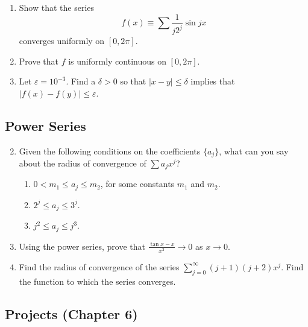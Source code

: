 \documentclass{article}
\begin{document}
\begin{enumerate}
\begin{enumerate}
                  \item Show that the series
                        \[
                              f(x)\equiv \sum \frac{1}{j2^j}\sin jx
                        \]
                        converges uniformly on $[0,2\pi]$.
                  \item Prove that $f$ is uniformly continuous on $[0,2\pi]$.
                  \item Let $\varepsilon=10^{-3}$. Find a $\delta>0$ so that
                        $\lvert x-y\rvert\leq \delta$ implies that
                        $\lvert f(x)-f(y)\rvert\leq \varepsilon$.
            \end{enumerate}
\end{enumerate}

\subsection{Power Series}

\begin{enumerate}
      \setcounter{enumi}{1}
      \item Given the following conditions on the coefficients $\{a_j\}$, what
            can you say about the radius of convergence of $\sum a_jx^j$?
            \begin{enumerate}
                  \item $0<m_1\leq a_j\leq m_2$, for some constants $m_1$ and $m_2$.
                  \item $2^j\leq a_j\leq 3^j$.
                  \item $j^2\leq a_j\leq j^3$.
            \end{enumerate}
            \setcounter{enumi}{5}
      \item Using the power series, prove that
            $\frac{\tan x-x}{x^2}\to 0$ as $x\to 0$.
            \setcounter{enumi}{10}
      \item Find the radius of convergence of the series
            $\sum_{j=0}^\infty(j+1)(j+2)x^j$. Find the function to which
            the series converges.
\end{enumerate}

\subsection*{Projects (Chapter 6)}
\end{document}

